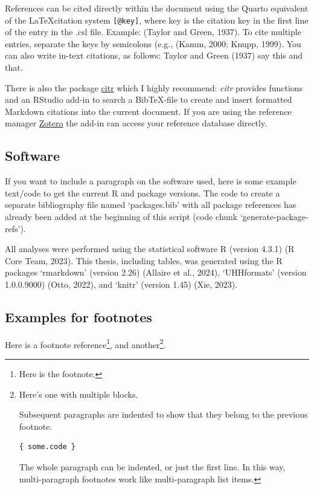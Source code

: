 \documentclass[
  letterpaper,
  DIV=11,
  numbers=noendperiod]{scrartcl}
\begin{document}
References can be cited directly within the document using the Quarto
equivalent of the \LaTeX citation system \texttt{{[}@key{]}}, where key
is the citation key in the first line of the entry in the .csl file.
Example: (Taylor and Green, 1937). To cite multiple entries, separate
the keys by semicolons (e.g., (Kamm, 2000; Knupp, 1999). You can also
write in-text citations, as follows: Taylor and Green (1937) say this
and that.

There is also the package \href{https://github.com/crsh/citr}{citr}
which I highly recommend: \emph{citr} provides functions and an RStudio
add-in to search a BibTeX-file to create and insert formatted Markdown
citations into the current document. If you are using the reference
manager \href{https://www.zotero.org/}{Zotero} the add-in can access
your reference database directly.

\subsection{Software}\label{software}

If you want to include a paragraph on the software used, here is some
example text/code to get the current R and package versions. The code to
create a separate bibliography file named `packages.bib' with all
package references has already been added at the beginning of this
script (code chunk `generate-package-refs').

All analyses were performed using the statistical software R (version
4.3.1) (R Core Team, 2023). This thesis, including tables, was generated
using the R packages `rmarkdown' (version 2.26) (Allaire et al., 2024),
`UHHformats' (version 1.0.0.9000) (Otto, 2022), and `knitr' (version
1.45) (Xie, 2023).

\subsection{Examples for footnotes}\label{examples-for-footnotes}

Here is a footnote reference\footnote{Here is the footnote.}, and
another\footnote{Here's one with multiple blocks.

  Subsequent paragraphs are indented to show that they belong to the
  previous footnote.

\begin{Verbatim}
{ some.code }
\end{Verbatim}

  The whole paragraph can be indented, or just the first line. In this
  way, multi-paragraph footnotes work like multi-paragraph list items.}.
\end{document}
